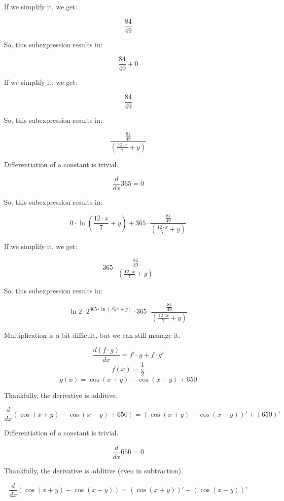\documentclass[12pt]{article}
\begin{document}
If we simplify it, we get:

$$ \frac{ 84 }{ 49 } $$

So, this subexpression results in:

$$ \frac{ 84 }{ 49 } +  0  $$

If we simplify it, we get:

$$ \frac{ 84 }{ 49 } $$

So, this subexpression results in:

$$ \frac{\frac{ 84 }{ 49 }}{\left(\frac{ 12  \cdot  x }{ 7 } +  y \right)} $$

Differentiation of a constant is trivial.

$$ \frac{d}{dx} 365 = 0 $$

So, this subexpression results in:

$$  0  \cdot \ln \left(\frac{ 12  \cdot  x }{ 7 } +  y \right) +  365  \cdot \frac{\frac{ 84 }{ 49 }}{\left(\frac{ 12  \cdot  x }{ 7 } +  y \right)} $$

If we simplify it, we get:

$$  365  \cdot \frac{\frac{ 84 }{ 49 }}{\left(\frac{ 12  \cdot  x }{ 7 } +  y \right)} $$

So, this subexpression results in:

$$ \ln  2  \cdot  2 ^{ 365  \cdot \ln \left(\frac{ 12  \cdot  x }{ 7 } +  y \right)} \cdot  365  \cdot \frac{\frac{ 84 }{ 49 }}{\left(\frac{ 12  \cdot  x }{ 7 } +  y \right)} $$

Multiplication is a bit difficult, but we can still manage it.

$$ \frac{d (f \cdot g)}{dx} = f' \cdot g + f \cdot g' $$
$$ f(x) = \frac{ 1 }{ 2 } $$
$$ g(x) = \cos \left( x  +  y \right) - \cos \left( x  -  y \right) +  650  $$

Thankfully, the derivative is additive.

$$ \frac{d}{dx} \left(\cos \left( x  +  y \right) - \cos \left( x  -  y \right) +  650 \right) = \left(\cos \left( x  +  y \right) - \cos \left( x  -  y \right)\right)' + \left( 650 \right)' $$

Differentiation of a constant is trivial.

$$ \frac{d}{dx} 650 = 0 $$

Thankfully, the derivative is additive (even in subtraction).

$$ \frac{d}{dx} \left(\cos \left( x  +  y \right) - \cos \left( x  -  y \right)\right) = \left(\cos \left( x  +  y \right)\right)' - \left(\cos \left( x  -  y \right)\right)' $$
\end{document}
